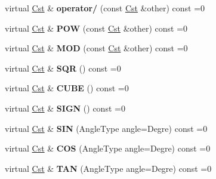 \begin{DoxyCompactItemize}
\item 
\hypertarget{classcalcul_1_1_cst_aff0c1e1b70e53fb617861983730c07ff}{virtual \hyperlink{classcalcul_1_1_cst}{Cst} \& {\bfseries operator/} (const \hyperlink{classcalcul_1_1_cst}{Cst} \&other) const =0}\label{classcalcul_1_1_cst_aff0c1e1b70e53fb617861983730c07ff}

\item 
\hypertarget{classcalcul_1_1_cst_a6d682c73fab890843b1ca2fe6f52c031}{virtual \hyperlink{classcalcul_1_1_cst}{Cst} \& {\bfseries P\-O\-W} (const \hyperlink{classcalcul_1_1_cst}{Cst} \&other) const =0}\label{classcalcul_1_1_cst_a6d682c73fab890843b1ca2fe6f52c031}

\item 
\hypertarget{classcalcul_1_1_cst_ac5ec99196eb483ea7002b21d587b37f4}{virtual \hyperlink{classcalcul_1_1_cst}{Cst} \& {\bfseries M\-O\-D} (const \hyperlink{classcalcul_1_1_cst}{Cst} \&other) const =0}\label{classcalcul_1_1_cst_ac5ec99196eb483ea7002b21d587b37f4}

\item 
\hypertarget{classcalcul_1_1_cst_add103ef84aa3c58fcf3fe62f36473e87}{virtual \hyperlink{classcalcul_1_1_cst}{Cst} \& {\bfseries S\-Q\-R} () const =0}\label{classcalcul_1_1_cst_add103ef84aa3c58fcf3fe62f36473e87}

\item 
\hypertarget{classcalcul_1_1_cst_aac65269af13a78677d25af8513e89892}{virtual \hyperlink{classcalcul_1_1_cst}{Cst} \& {\bfseries C\-U\-B\-E} () const =0}\label{classcalcul_1_1_cst_aac65269af13a78677d25af8513e89892}

\item 
\hypertarget{classcalcul_1_1_cst_ae1ef0d7b1702ec42daa2c48ce0317bcc}{virtual \hyperlink{classcalcul_1_1_cst}{Cst} \& {\bfseries S\-I\-G\-N} () const =0}\label{classcalcul_1_1_cst_ae1ef0d7b1702ec42daa2c48ce0317bcc}

\item 
\hypertarget{classcalcul_1_1_cst_a9eee774878d7999497f9ae5bed62d50e}{virtual \hyperlink{classcalcul_1_1_cst}{Cst} \& {\bfseries S\-I\-N} (Angle\-Type angle=Degre) const =0}\label{classcalcul_1_1_cst_a9eee774878d7999497f9ae5bed62d50e}

\item 
\hypertarget{classcalcul_1_1_cst_a5d1586652f8785e0205d5dc4709605f1}{virtual \hyperlink{classcalcul_1_1_cst}{Cst} \& {\bfseries C\-O\-S} (Angle\-Type angle=Degre) const =0}\label{classcalcul_1_1_cst_a5d1586652f8785e0205d5dc4709605f1}

\item 
\hypertarget{classcalcul_1_1_cst_aafa0aa31332b8e4ea10e311325144109}{virtual \hyperlink{classcalcul_1_1_cst}{Cst} \& {\bfseries T\-A\-N} (Angle\-Type angle=Degre) const =0}\label{classcalcul_1_1_cst_aafa0aa31332b8e4ea10e311325144109}


\end{DoxyCompactItemize}
